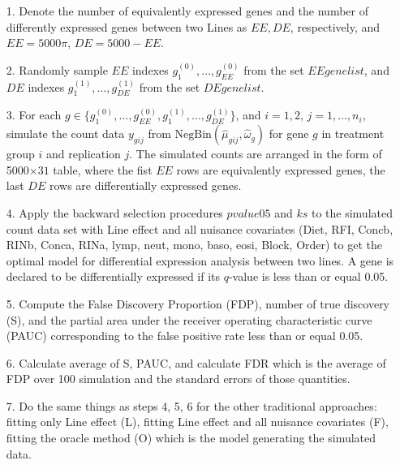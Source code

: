 \documentclass[12pt, letter]{article}\usepackage[]{graphicx}\usepackage[]{color}
\begin{document}
\begin{itemize}
\item[1. ] Denote the number of equivalently expressed genes and the number of differently expressed genes between two Lines as $EE, DE$, respectively, and $EE = 5000\pi$, $DE = 5000-EE$.

\item[2. ] Randomly sample $EE$ indexes $g^{(0)}_1, \dots, g^{(0)}_{EE}$ from the set $EEgenelist$, and $DE$ indexes $g^{(1)}_1, \dots, g^{(1)}_{DE}$ from the set $DEgenelist$.

\item[3.] For each $g \in \{ g^{(0)}_1, \dots, g^{(0)}_{EE}, g^{(1)}_1, \dots, g^{(1)}_{DE}\}$, and $i = 1, 2$, $j = 1, \dots, n_i $,  simulate the count data $y_{gij}$ from $\mbox{NegBin}(\hat{\mu}_{gij}, \hat{\omega}_{g})$ for gene $g$ in treatment group $i$ and replication $j$. The simulated counts are arranged in the form of 5000$\times 31$ table, where the fist $EE$ rows are equivalently expressed genes, the last $DE$ rows are differentially expressed genes.

\item[4. ] Apply the backward selection procedures $pvalue05$ and $ks$ to the simulated count data set with Line effect and all nuisance covariates (Diet, RFI, Concb, RINb, Conca, RINa, lymp, neut, mono, baso, eosi, Block, Order) to get the optimal model for  differential expression analysis  between two lines. A gene is declared to be differentially expressed if its $q$-value is less than or equal 0.05.

\item[5. ] Compute the False Discovery Proportion (FDP), number of true discovery (S), and the partial area under the receiver operating  characteristic curve (PAUC) corresponding to the false positive rate less than or equal 0.05. 

\item[6.] Calculate average of  S, PAUC, and calculate FDR which is the average of FDP over 100 simulation and the standard errors of those quantities.

\item[7. ] Do the same things as steps 4, 5, 6 for the other traditional approaches: fitting only Line effect (L), fitting Line effect and all nuisance covariates (F), fitting the oracle method (O)  which is the model generating the simulated data. 
\end{itemize}
\end{document}
